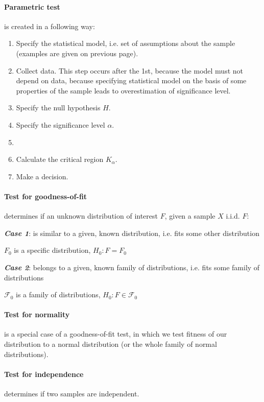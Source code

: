 \paragraph{Parametric test}
is created in a following way:

\begin{enumerate}

  \item Specify the statistical model, i.e. set of assumptions about the sample (examples are given
  on previous page).

  \item Collect data. This step occurs after the 1st, because the model must not depend on data,
  because specifying statistical model on the basis of some properties of the sample leads to
  overestimation of significance level.

  \item Specify the null hypothesis $H$.

  \item Specify the significance level $\alpha$.

  \item 

  \item Calculate the critical region $K_\alpha$.

  \item Make a decision.

\end{enumerate}

\paragraph{Test for goodness-of-fit}
determines if an unknown distribution of interest $F$, given a sample $X$ i.i.d. $F$:

\noindent \textbf{\em Case 1}:
is similar to a given, known distribution, i.e. fits some other distribution

$F_0$ is a specific distribution, $H_0: F=F_0$

\noindent \textbf{\em Case 2}:
belongs to a given, known family of distributions, i.e. fits some family of distributions

$\mathcal{F}_0$ is a family of distributions, $H_0: F \in \mathcal{F}_0$

\paragraph{Test for normality}
is a special case of a goodness-of-fit test, in which we test fitness of our distribution to a normal
distribution (or the whole family of normal distributions).

\paragraph{Test for independence}
determines if two samples are independent.

